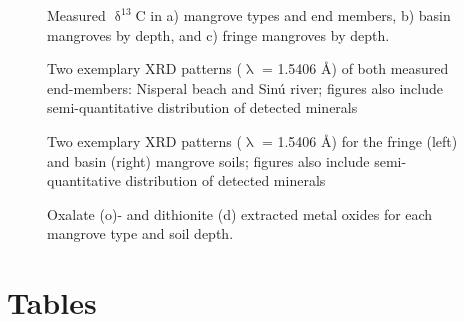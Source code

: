 \begin{figure}[H]
\caption{Measured $\updelta^{13}$C in a) mangrove types and end members, b) basin mangroves by depth, and c) fringe mangroves by depth. }
\label{fig:3}       %
\end{figure}

\begin{figure}[H]
\caption{Two exemplary XRD patterns ($\uplambda$ = 1.5406 \AA) of both measured end-members: Nisperal beach and Sin\'{u} river; figures also include semi-quantitative distribution of detected minerals}
\label{fig:4}       %
\end{figure}

\begin{figure}[H]
\caption{Two exemplary XRD patterns ($\uplambda$ = 1.5406 \AA) for the fringe (left) and basin (right) mangrove soils; figures also include semi-quantitative distribution of detected minerals}
\label{fig:5}       %
\end{figure}

\begin{figure}[H]
\caption{Oxalate (o)- and dithionite (d) extracted metal oxides for each mangrove type and soil depth.}
\label{fig:6}       %
\end{figure}

\clearpage

\section*{Tables}

